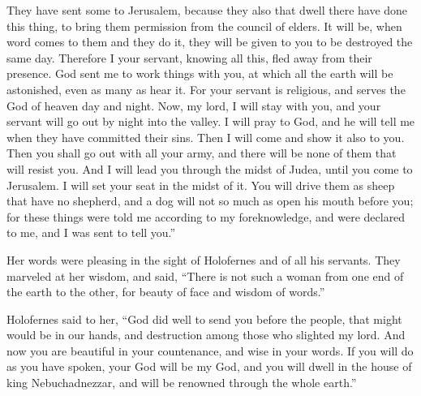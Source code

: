 {They have sent some to Jerusalem, because they also that dwell there have done this thing, to bring them permission from the council of elders.
It will be, when word comes to them and they do it, they will be given to you to be destroyed the same day.
Therefore I your servant, knowing all this, fled away from their presence. God sent me to work things with you, at which all the earth will be astonished, even as many as hear it.
For your servant is religious, and serves the God of heaven day and night. Now, my lord, I will stay with you, and your servant will go out by night into the valley. I will pray to God, and he will tell me when they have committed their sins.
Then I will come and show it also to you. Then you shall go out with all your army, and there will be none of them that will resist you.
And I will lead you through the midst of Judea, until you come to Jerusalem. I will set your seat in the midst of it. You will drive them as sheep that have no shepherd, and a dog will not so much as open his mouth before you; for these things were told me according to my foreknowledge, and were declared to me, and I was sent to tell you.”
\par }{\PP {}Her words were pleasing in the sight of Holofernes and of all his servants. They marveled at her wisdom, and said,
“There is not such a woman from one end of the earth to the other, for beauty of face and wisdom of words.”
\par }{\PP {}Holofernes said to her, “God did well to send you before the people, that might would be in our hands, and destruction among those who slighted my lord.
And now you are beautiful in your countenance, and wise in your words. If you will do as you have spoken, your God will be my God, and you will dwell in the house of king Nebuchadnezzar, and will be renowned through the whole earth.”

}
